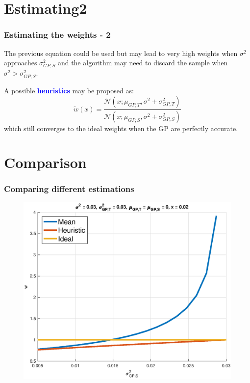 \documentclass[professionalfont]{beamer}
\begin{document}
    \section{Estimating2}
       \begin{frame}
       \frametitle{Estimating the weights - 2}
       The previous equation could be used but may lead to very high weights
       when $\sigma^{2}$ approaches $\sigma^{2}_{GP,S}$ and the algorithm
       may need to discard the sample when $\sigma^{2} > \sigma^{2}_{GP,S}$.\newline

       \pause
       A possible \textcolor{blue}{\textbf{heuristics}} may be proposed as:
       \begin{equation*}
         \tilde{w}(x) = \frac{\mathcal{N}(x; \mu_{GP,T}, \sigma^{2}+\sigma^{2}_{GP,T})}{\mathcal{N}(x; \mu_{GP,S}, \sigma^{2} + \sigma^{2}_{GP,S})}
       \end{equation*}
       which still converges to the ideal weights when the GP are perfectly accurate.
       \end{frame}

    \section{Comparison}
      \begin{frame}
      \frametitle{Comparing different estimations}
        \begin{figure}
          \includegraphics[scale=0.5]{images/comparison.eps}
          \caption{}
          \label{}
        \end{figure}
      \end{frame}
\end{document}

